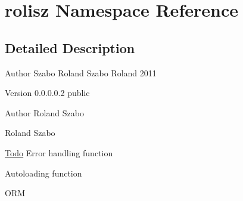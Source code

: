 \hypertarget{namespacerolisz}{
\section{rolisz Namespace Reference}
\label{namespacerolisz}
}


\subsection{Detailed Description}
\begin{DoxyAuthor}{Author}
Szabo Roland  Szabo Roland 2011 
\end{DoxyAuthor}
\begin{DoxyVersion}{Version}
0.0.0.0.2  public
\end{DoxyVersion}
\begin{DoxyAuthor}{Author}
Roland Szabo

Roland Szabo 
\end{DoxyAuthor}
\begin{Desc}
\item[\hyperlink{todo__todo000001}{Todo}]Error handling function 

Autoloading function 

ORM \end{Desc}
